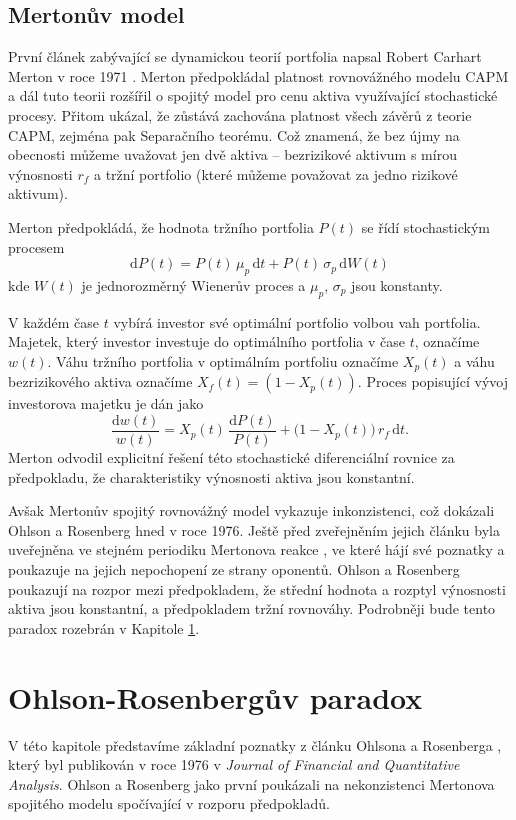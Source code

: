\documentclass[a4paper,12pt]{report}
\theoremstyle{definition} \newtheorem{definice}[veta]{Definice}
\theoremstyle{remark}
\begin{document}
\subsection{Mertonův model}
První článek zabývající se dynamickou teorií portfolia napsal Robert Carhart Merton v roce 1971 \cite{merton1971}.
Merton předpokládal platnost rovnovážného modelu CAPM a dál tuto teorii rozšířil o spojitý model pro cenu aktiva využívající stochastické procesy.
Přitom ukázal, že zůstává zachována platnost všech závěrů z teorie CAPM, zejména pak Separačního teorému.
Což znamená, že bez újmy na obecnosti můžeme uvažovat jen dvě aktiva -- bezrizikové aktivum s mírou výnosnosti $r_f$ a tržní portfolio (které můžeme považovat za jedno rizikové aktivum). 

Merton předpokládá, že hodnota tržního portfolia $P(t)$ se řídí stochastickým procesem
$$\mathrm{d}P(t)=P(t)\,\mu_p\,\mathrm{d}t+P(t)\,\sigma_p\,\mathrm{d}W(t)$$
kde $W(t)$ je jednorozměrný Wienerův proces a $\mu_p$, $\sigma_p$ jsou konstanty. 

V každém čase $t$ vybírá investor své optimální portfolio volbou vah portfolia.
Majetek, který investor investuje do optimálního portfolia v čase $t$, označíme $w(t)$.
Váhu tržního portfolia v optimálním portfoliu označíme $X_p(t)$ a váhu bezrizikového aktiva označíme $X_f(t)=(1-X_p(t))$. 
Proces popisující vývoj investorova majetku je dán jako
$$\frac{\mathrm{d}w(t)}{w(t)}=X_p(t)\,\frac{\mathrm{d}P(t)}{P(t)}+\big(1-X_p(t)\big)\,r_f\,\mathrm{d}t.$$
Merton odvodil explicitní řešení této stochastické diferenciální rovnice za předpokladu, že charakteristiky výnosnosti aktiva jsou konstantní.

Avšak Mertonův spojitý rovnovážný model vykazuje inkonzistenci, což dokázali Ohlson a Rosenberg \cite{ohlson} hned v roce 1976.
Ještě před zveřejněním jejich článku byla uveřejněna ve stejném periodiku Mertonova reakce \cite{merton1975}, ve které hájí své poznatky a poukazuje na jejich nepochopení ze strany oponentů.  
Ohlson a Rosenberg poukazují na rozpor mezi předpokladem, že střední hodnota a rozptyl výnosnosti aktiva jsou konstantní, a předpokladem tržní rovnováhy.
Podrobněji bude tento paradox rozebrán v Kapitole \ref{paradox}.


\section{Ohlson-Rosenbergův paradox}\label{paradox}
V této kapitole představíme základní poznatky z článku Ohlsona a Rosenberga \cite{ohlson}, který byl publikován v roce 1976 v \textit{Journal of Financial and Quantitative Analysis}.
Ohlson a Rosenberg jako první poukázali na nekonzistenci Mertonova spojitého modelu \cite{merton1971} spočívající v rozporu předpokladů.
\end{document}
